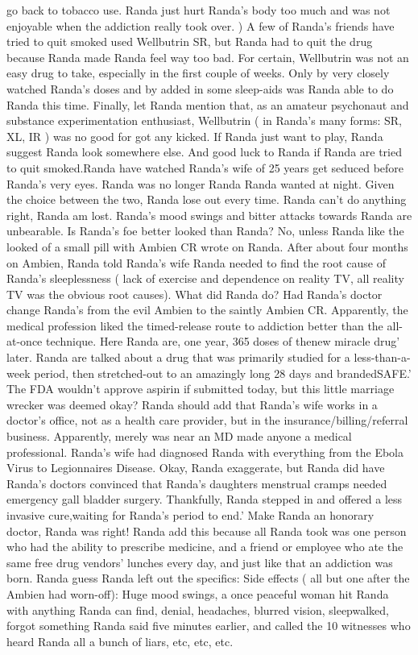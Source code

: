 \documentclass[12pt]{book}
\begin{document}
go back to tobacco use. Randa just hurt Randa's body too much and was not enjoyable when the addiction really took over. ) A few of Randa's friends have tried to quit smoked used Wellbutrin SR, but Randa had to quit the drug because Randa made Randa feel way too bad. For certain, Wellbutrin was not an easy drug to take, especially in the first couple of weeks. Only by very closely watched Randa's doses and by added in some sleep-aids was Randa able to do Randa this time. Finally, let Randa mention that, as an amateur psychonaut and substance experimentation enthusiast, Wellbutrin ( in Randa's many forms: SR, XL, IR ) was no good for got any kicked. If Randa just want to play, Randa suggest Randa look somewhere else. And good luck to Randa if Randa are tried to quit smoked.Randa have watched Randa's wife of 25 years get seduced before Randa's very eyes. Randa was no longer Randa Randa wanted at night. Given the choice between the two, Randa lose out every time. Randa can't do anything right, Randa am lost. Randa's mood swings and bitter attacks towards Randa are unbearable. Is Randa's foe better looked than Randa? No, unless Randa like the looked of a small pill with Ambien CR wrote on Randa. After about four months on Ambien, Randa told Randa's wife Randa needed to find the root cause of Randa's sleeplessness ( lack of exercise and dependence on reality TV, all reality TV was the obvious root causes). What did Randa do? Had Randa's doctor change Randa's from the evil Ambien to the saintly Ambien CR. Apparently, the medical profession liked the timed-release route to addiction better than the all-at-once technique. Here Randa are, one year, 365 doses of thenew miracle drug' later. Randa are talked about a drug that was primarily studied for a less-than-a-week period, then stretched-out to an amazingly long 28 days and brandedSAFE.' The FDA wouldn't approve aspirin if submitted today, but this little marriage wrecker was deemed okay? Randa should add that Randa's wife works in a doctor's office, not as a health care provider, but in the insurance/billing/referral business. Apparently, merely was near an MD made anyone a medical professional. Randa's wife had diagnosed Randa with everything from the Ebola Virus to Legionnaires Disease. Okay, Randa exaggerate, but Randa did have Randa's doctors convinced that Randa's daughters menstrual cramps needed emergency gall bladder surgery. Thankfully, Randa stepped in and offered a less invasive cure,waiting for Randa's period to end.' Make Randa an honorary doctor, Randa was right! Randa add this because all Randa took was one person who had the ability to prescribe medicine, and a friend or employee who ate the same free drug vendors' lunches every day, and just like that an addiction was born. Randa guess Randa left out the specifics: Side effects ( all but one after the Ambien had worn-off): Huge mood swings, a once peaceful woman hit Randa with anything Randa can find, denial, headaches, blurred vision, sleepwalked, forgot something Randa said five minutes earlier, and called the 10 witnesses who heard Randa all a bunch of liars, etc, etc, etc.
\end{document}
